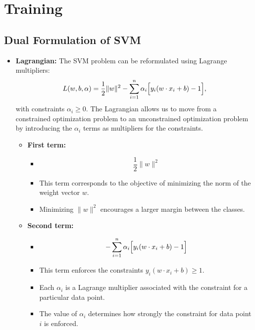 \documentclass[10pt]{article}
\begin{document}
\section{Training}
\subsection{Dual Formulation of SVM}
    \begin{itemize}
       \item \textbf{Lagrangian:} The SVM problem can be reformulated using Lagrange multipliers:
        \[
        L(w, b, \alpha) = \frac{1}{2}\|w\|^2 - \sum_{i=1}^{n} \alpha_i \Bigl[y_i (w \cdot x_i + b) - 1\Bigr],
        \]
        with constraints \(\alpha_i \geq 0\). The Lagrangian allows us to move from a constrained optimization problem to an unconstrained optimization problem by introducing the \(\alpha_i\) terms as multipliers for the constraints.
    
        \begin{itemize}
            \item \textbf{First term:} 
                \begin{itemize}
                    \item \[
                          \frac{1}{2}\|w\|^2
                          \]
                    \item This term corresponds to the objective of minimizing the norm of the weight vector \(w\).
                    \item Minimizing \(\|w\|^2\) encourages a larger margin between the classes.
                \end{itemize}
                
            \item \textbf{Second term:} 
                \begin{itemize}
                    \item \[
                          -\sum_{i=1}^{n} \alpha_i \Bigl[y_i (w \cdot x_i + b) - 1\Bigr]
                          \]
                    \item This term enforces the constraints \(y_i (w \cdot x_i + b) \geq 1\).
                    \item Each \(\alpha_i\) is a Lagrange multiplier associated with the constraint for a particular data point.
                    \item The value of \(\alpha_i\) determines how strongly the constraint for data point \(i\) is enforced.
                \end{itemize}
    

\end{itemize}
\end{itemize}
\end{document}
